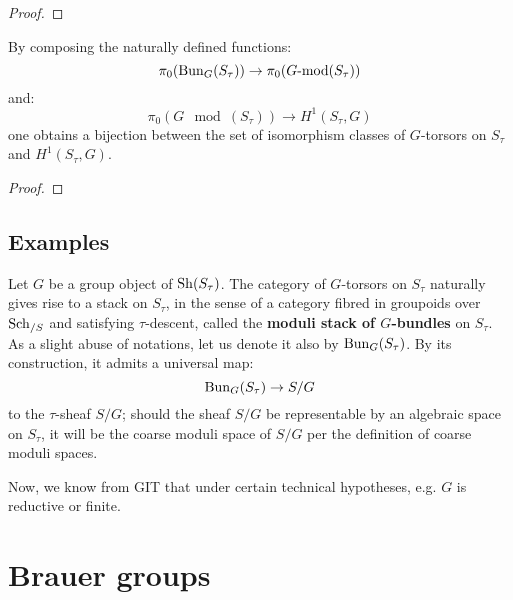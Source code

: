                 \begin{proof}
                    
                \end{proof}
            \begin{theorem}
                By composing the naturally defined functions:
                    $$\pi_0( \mathrm{Bun}_G(S_{\tau}) ) \to \pi_0(G\text{-}\mathrm{mod}(S_{\tau}))$$
                and:
                    $$\pi_0( G\mod(S_{\tau}) ) \to H^1(S_{\tau}, G)$$
                one obtains a bijection between the set of isomorphism classes of $G$-torsors on $S_{\tau}$ and $H^1(S_{\tau}, G)$.
            \end{theorem}
                \begin{proof}
                    
                \end{proof}

        \subsection{Examples}
            \begin{example}
                Let $G$ be a group object of $\mathrm{Sh}(S_{\tau})$. The category of $G$-torsors on $S_{\tau}$ naturally gives rise to a stack on $S_{\tau}$, in the sense of a category fibred in groupoids over $\mathrm{Sch}_{/S}$ and satisfying $\tau$-descent, called the \textbf{moduli stack of $G$-bundles} on $S_{\tau}$. As a slight abuse of notations, let us denote it also by $\mathrm{Bun}_G(S_{\tau})$. By its construction, it admits a universal map:
                    $$\mathrm{Bun}_G(S_{\tau}) \to S/G$$
                to the $\tau$-sheaf $S/G$; should the sheaf $S/G$ be representable by an algebraic space on $S_{\tau}$, it will be the coarse moduli space of $S/G$ per the definition of coarse moduli spaces.

                Now, we know from GIT that under certain technical hypotheses, e.g. $G$ is reductive or finite.
            \end{example}

            \begin{example}
                
            \end{example}

            \begin{example}[Twistings]
                
            \end{example}

    \section{Brauer groups}
    
    \printbibliography

